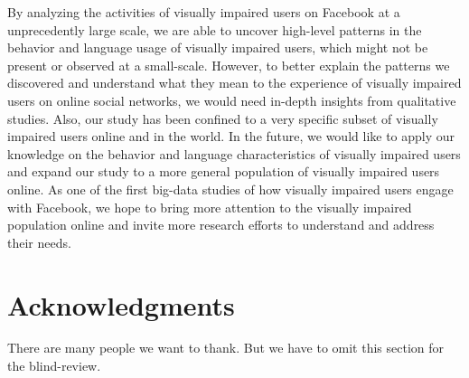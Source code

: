\documentclass{sigchi}
\begin{document}
By analyzing the activities of visually impaired users on Facebook at a unprecedently large scale, we are able to uncover high-level patterns in the behavior and language usage of visually impaired users, which might not be present or observed at a small-scale.  However, to better explain the patterns we discovered and understand what they mean to the experience of visually impaired users on online social networks, we would need in-depth insights from qualitative studies. Also, our study has been confined to a very specific subset of visually impaired users online and in the world. In the future, we would like to apply our knowledge on the behavior and language characteristics of visually impaired users and expand our study to a more general population of visually impaired users online. As one of the first big-data studies of how visually impaired users engage with Facebook, we hope to bring more attention to the visually impaired population online and invite more research efforts to understand and address their needs. 













\section{Acknowledgments}
There are many people we want to thank. But we have to omit this section for the blind-review. 
\end{document}
